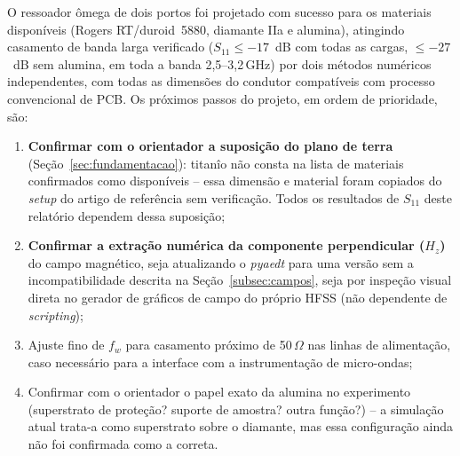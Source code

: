 \documentclass[10pt,a4paper,twocolumn]{article}
\begin{document}
O ressoador \^omega de dois portos foi projetado com sucesso para os
materiais dispon\'iveis (Rogers RT/duroid~5880, diamante IIa e
alumina), atingindo casamento de banda larga verificado
($S_{11} \leq -17$~dB com todas as cargas, $\leq -27$~dB sem alumina,
em toda a banda 2,5--3,2\,GHz) por dois m\'etodos
num\'ericos independentes, com todas as dimens\~oes do condutor
compat\'iveis com processo convencional de PCB. Os pr\'oximos passos
do projeto, em ordem de prioridade, s\~ao:

\begin{enumerate}
	\item \textbf{Confirmar com o orientador a suposi\c{c}\~ao do plano
	de terra} (Se\c{c}\~ao~\ref{sec:fundamentacao}): titan\^io n\~ao
	consta na lista de materiais confirmados como dispon\'iveis --
	essa dimens\~ao e material foram copiados do \emph{setup} do
	artigo de refer\^encia sem verifica\c{c}\~ao. Todos os resultados
	de $S_{11}$ deste relat\'orio dependem dessa suposi\c{c}\~ao;
	\item \textbf{Confirmar a extra\c{c}\~ao num\'erica da componente
	perpendicular ($H_z$)} do campo magn\'etico, seja atualizando o
	\emph{pyaedt} para uma vers\~ao sem a incompatibilidade descrita na
	Se\c{c}\~ao~\ref{subsec:campos}, seja por inspe\c{c}\~ao visual
	direta no gerador de gr\'aficos de campo do pr\'oprio HFSS
	(n\~ao dependente de \emph{scripting});
	\item Ajuste fino de $f_w$ para casamento pr\'oximo de
	50\,$\Omega$ nas linhas de alimenta\c{c}\~ao, caso necess\'ario
	para a interface com a instrumenta\c{c}\~ao de micro-ondas;
	\item Confirmar com o orientador o papel exato da alumina no
	experimento (superstrato de prote\c{c}\~ao? suporte de amostra?
	outra fun\c{c}\~ao?) -- a simula\c{c}\~ao atual trata-a como
	superstrato sobre o diamante, mas essa configura\c{c}\~ao ainda
	n\~ao foi confirmada como a correta.
\end{enumerate}

\clearpage
\printbibliography[heading=bibintoc,title={Refer\^encias}]
\end{document}
